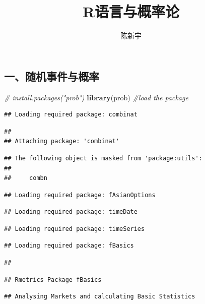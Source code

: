 \documentclass[]{article}
\title{R语言与概率论}
\author{陈新宇}
\date{}
\newenvironment{Shaded}{\begin{snugshade}}{\end{snugshade}}
\newcommand{\KeywordTok}[1]{\textcolor[rgb]{0.13,0.29,0.53}{\textbf{{#1}}}}
\newcommand{\CommentTok}[1]{\textcolor[rgb]{0.56,0.35,0.01}{\textit{{#1}}}}
\newcommand{\NormalTok}[1]{{#1}}
\begin{document}
\maketitle

\subsection{一、随机事件与概率}

\begin{Shaded}
\begin{Highlighting}[]
\CommentTok{# install.packages("prob") }
\KeywordTok{library}\NormalTok{(prob)  }\CommentTok{#load the package}
\end{Highlighting}
\end{Shaded}

\begin{verbatim}
## Loading required package: combinat
\end{verbatim}

\begin{verbatim}
## 
## Attaching package: 'combinat'
\end{verbatim}

\begin{verbatim}
## The following object is masked from 'package:utils':
## 
##     combn
\end{verbatim}

\begin{verbatim}
## Loading required package: fAsianOptions
\end{verbatim}

\begin{verbatim}
## Loading required package: timeDate
\end{verbatim}

\begin{verbatim}
## Loading required package: timeSeries
\end{verbatim}

\begin{verbatim}
## Loading required package: fBasics
\end{verbatim}

\begin{verbatim}
## 
\end{verbatim}

\begin{verbatim}
## Rmetrics Package fBasics
\end{verbatim}

\begin{verbatim}
## Analysing Markets and calculating Basic Statistics
\end{verbatim}
\end{document}
